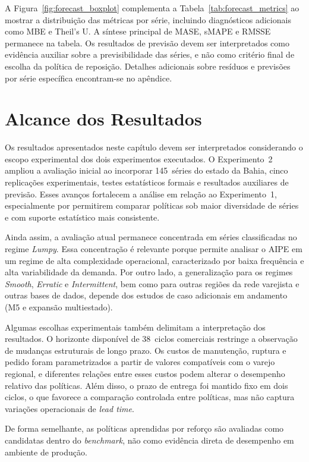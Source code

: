 A Figura~\ref{fig:forecast_boxplot} complementa a Tabela~\ref{tab:forecast_metrics} ao mostrar a distribuição das métricas por série, incluindo diagnósticos adicionais como MBE e Theil's U. A síntese principal de MASE, sMAPE e RMSSE permanece na tabela. Os resultados de previsão devem ser interpretados como evidência auxiliar sobre a previsibilidade das séries, e não como critério final de escolha da política de reposição. Detalhes adicionais sobre resíduos e previsões por série específica encontram-se no apêndice.

\section{Alcance dos Resultados}
\label{sec:threats}

Os resultados apresentados neste capítulo devem ser interpretados considerando o escopo experimental dos dois experimentos executados. O Experimento~2 ampliou a avaliação inicial ao incorporar 145~séries do estado da Bahia, cinco replicações experimentais, testes estatísticos formais e resultados auxiliares de previsão. Esses avanços fortalecem a análise em relação ao Experimento~1, especialmente por permitirem comparar políticas sob maior diversidade de séries e com suporte estatístico mais consistente.

Ainda assim, a avaliação atual permanece concentrada em séries classificadas no regime \textit{Lumpy}. Essa concentração é relevante porque permite analisar o AIPE em um regime de alta complexidade operacional, caracterizado por baixa frequência e alta variabilidade da demanda. Por outro lado, a generalização para os regimes \textit{Smooth}, \textit{Erratic} e \textit{Intermittent}, bem como para outras regiões da rede varejista e outras bases de dados, depende dos estudos de caso adicionais em andamento (M5 e expansão multiestado).

Algumas escolhas experimentais também delimitam a interpretação dos resultados. O horizonte disponível de 38~ciclos comerciais restringe a observação de mudanças estruturais de longo prazo. Os custos de manutenção, ruptura e pedido foram parametrizados a partir de valores compatíveis com o varejo regional, e diferentes relações entre esses custos podem alterar o desempenho relativo das políticas. Além disso, o prazo de entrega foi mantido fixo em dois ciclos, o que favorece a comparação controlada entre políticas, mas não captura variações operacionais de \textit{lead time}.

De forma semelhante, as políticas aprendidas por reforço são avaliadas como candidatas dentro do \textit{benchmark}, não como evidência direta de desempenho em ambiente de produção.


